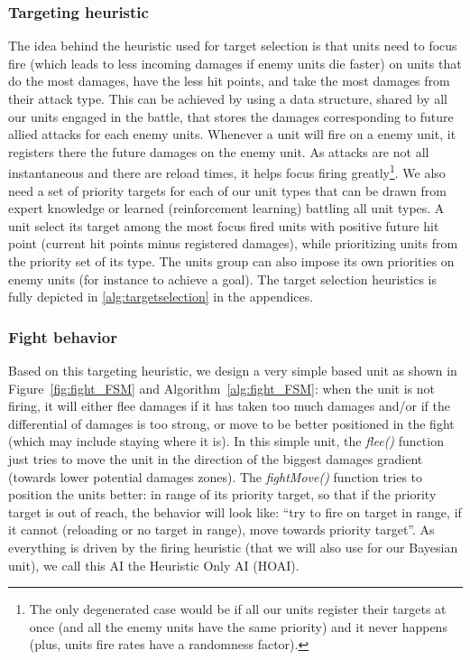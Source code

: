 \subsubsection{Targeting heuristic}
The idea behind the heuristic used for target selection is that units need to focus fire (which leads to less incoming damages if enemy units die faster) on units that do the most damages, have the less hit points, and take the most damages from their attack type. This can be achieved by using a data structure, shared by all our units engaged in the battle, that stores the damages corresponding to future allied attacks for each enemy units. Whenever a unit will fire on a enemy unit, it registers there the future damages on the enemy unit. As attacks are not all instantaneous and there are reload times, it helps focus firing greatly\footnote{The only degenerated case would be if all our units register their targets at once (and all the enemy units have the same priority) and it never happens (plus, units fire rates have a randomness factor).}. 
We also need a set of priority targets for each of our unit types that can be drawn from expert knowledge or learned (reinforcement learning) battling all unit types. A unit select its target among the most focus fired units with positive future hit point (current hit points minus registered damages), while prioritizing units from the priority set of its type. The units group can also impose its own priorities on enemy units (for instance to achieve a goal). The target selection heuristics is fully depicted in \ref{alg:targetselection} in the appendices.

\subsubsection{Fight behavior}
\label{sec:HOAI}
Based on this targeting heuristic, we design a very simple  based unit as shown in Figure~\ref{fig:fight_FSM} and Algorithm~\ref{alg:fight_FSM}: when the unit is not firing, it will either flee damages if it has taken too much damages and/or if the differential of damages is too strong, or move to be better positioned in the fight (which may include staying where it is). In this simple unit, the \textit{flee()} function just tries to move the unit in the direction of the biggest damages gradient (towards lower potential damages zones). The \textit{fightMove()} function tries to position the units better: in range of its priority target, so that if the priority target is out of reach, the behavior will look like: ``try to fire on target in range, if it cannot (reloading or no target in range), move towards priority target''. As everything is driven by the firing heuristic (that we will also use for our Bayesian unit), we call this AI the Heuristic Only AI (HOAI).

